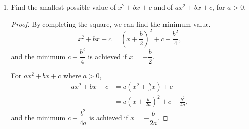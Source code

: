 \begin{exercise}[\textbf{18}]
\begin{enumerate}
\begin{proof}
    We just solve for the values of $\alpha$ that will assure $(\alpha y)^2
    -4y^2$ is less than zero.
    \begin{align*}
        (\alpha y)^2 -4y^2 &<0, \\
        \alpha^2 y^2 &< 4y^2, \\
        \alpha ^2 &< 4, \\
        |\alpha | &< 2. \\
    \end{align*}
    so the values of $\alpha$ that will make $x^2+\alpha xy +y^2 >0$ are
    \begin{equation*}
        -2 <\alpha < 2.
    \end{equation*}
    \end{proof}
    \item Find the smallest possible value of $x^2+bx+c$ and of $ax^2+bx+c$, for
    $a>0$.
    \begin{proof} By completing the square, we can find the minimum value.
        \begin{equation*}
            x^2+bx+c = \left( x+\frac{b}{2}\right)^2 +c-\frac{b^2}{4},
        \end{equation*}
        and the minimum $c-\dfrac{b^2}{4}$ is achieved if $x= -\dfrac{b}{2}$.

        For $ax^2+bx+c$ where $a>0$,
        \begin{align*}
            ax^2+bx+c &= a\left(x^2+\frac{b}{a}x\right)+c \\
            &= a\left( x+ \frac{b}{2a}\right)^2 + c- \frac{b^2}{4a},
        \end{align*}
        and the minimum $c-\dfrac{b^2}{4a}$ is achieved if $x= -\dfrac{b}{2a}$.
    \end{proof}
\end{enumerate}
\end{exercise}